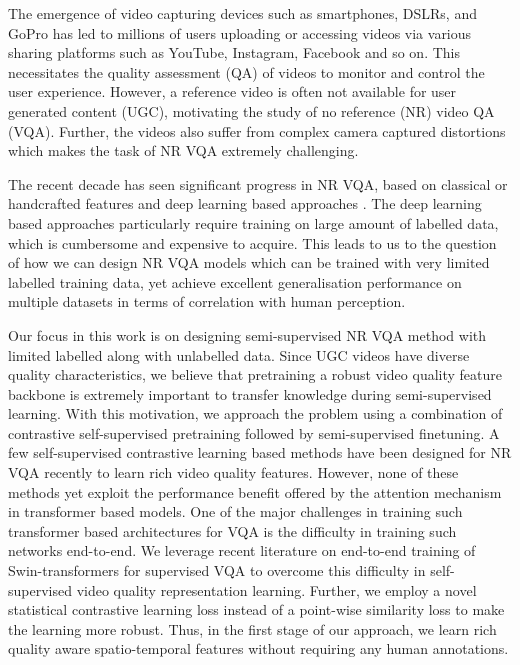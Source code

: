 \documentclass[10pt,twocolumn,letterpaper]{article}
\begin{document}
The emergence of video capturing devices such as smartphones, DSLRs, and GoPro has led to millions of users uploading or accessing videos via various sharing platforms such as YouTube, Instagram, Facebook and so on. This necessitates the quality assessment (QA) of videos to monitor and control the user experience. However, a reference video is often not available for user generated content (UGC), motivating the study of no reference (NR) video QA (VQA). Further, the videos also suffer from complex camera captured distortions which makes the task of NR VQA extremely challenging. 

The recent decade has seen significant progress in NR VQA, based on classical or handcrafted features \cite{vbliind,vcornia, friquee, videval,rapique} and deep learning based approaches \cite{qa_in_the_wild,mdtvsfa,fastVQA, rirnet,hierarchical_nrvqa}. The deep learning based approaches particularly require training on large amount of labelled data, which is cumbersome and expensive to acquire. This leads to us to the question of how we can design NR VQA models which can be trained with very limited labelled training data, yet achieve excellent generalisation performance on multiple datasets in terms of correlation with human perception. 

Our focus in this work is on designing semi-supervised NR VQA method with limited labelled along with unlabelled data. Since UGC videos have diverse quality characteristics, we believe that pretraining a robust video quality feature backbone is extremely important to transfer knowledge during semi-supervised learning. With this motivation, we approach the problem using a combination of contrastive self-supervised pretraining followed by semi-supervised finetuning.
A few self-supervised contrastive learning based methods have been designed for NR VQA recently \cite{vision,CONVIQT,cspt} to learn rich video quality features. However, none of these methods yet exploit the performance benefit offered by the attention mechanism in transformer based models. One of the major challenges in training such transformer based architectures for VQA is the difficulty in training such networks end-to-end. We leverage recent literature on end-to-end training of Swin-transformers for supervised VQA \cite{fastVQA}  to overcome this difficulty in self-supervised video quality representation learning. Further, we employ a novel statistical contrastive learning loss instead of a point-wise similarity loss to make the learning more robust. Thus, in the first stage of our approach, we learn rich quality aware spatio-temporal features without requiring any human annotations. 
\end{document}

